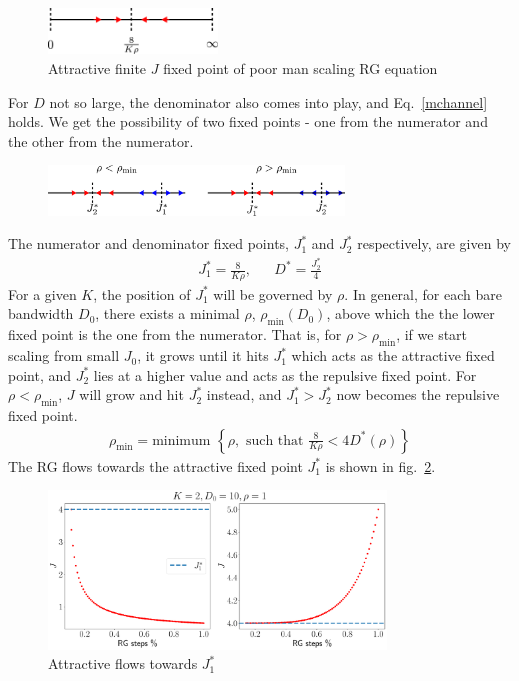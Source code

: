 \documentclass{revtex4-2}
\begin{document}
\begin{figure}[!htb]
	\centering
	\includegraphics[width=0.4\textwidth]{rg_flow_pms.pdf}
	\caption{Attractive finite \(J\) fixed point of poor man scaling RG equation}
\end{figure}
For \(D\) not so large, the denominator also comes into play, and Eq.~\ref{mchannel} holds. We get the possibility of two fixed points - one from the numerator and the other from the numerator.
\begin{figure}[!htb]
	\centering
	\includegraphics[width=0.7\textwidth]{./rg_flow.pdf}
	\caption{}
	\label{rg_flow_general}
\end{figure}

The numerator and denominator fixed points, \(J_1^*\) and \(J_2^*\) respectively, are given by
\begin{align}
	J_1^* = \frac{8}{K \rho}, && D^* = \frac{J_2^*}{4}
\end{align}
For a given \(K\), the position of \(J_1^*\) will be governed by \(\rho\). In general, for each bare bandwidth \(D_0\), there exists a minimal \(\rho\), $\rho_\text{min}(D_0)$, above which the the lower fixed point is the one from the numerator. That is, for \(\rho > \rho_\text{min}\), if we start scaling from small \(J_0\), it grows until it hits \(J_1^*\) which acts as the attractive fixed point, and \(J_2^*\) lies at a higher value and acts as the repulsive fixed point. For \(\rho < \rho_\text{min}\), \(J\) will grow and hit \(J_2^*\) instead, and \(J_1^* > J_2^*\) now becomes the repulsive fixed point.
\begin{align}
	\rho_\text{min} = \text{minimum }\left\{\rho, \text{ such that } \frac{8}{K \rho} < 4 D^*(\rho)\right\}
\end{align}
The RG flows towards the attractive fixed point \(J_1^*\) is shown  in fig.~\ref{rg_flow_K-2}.
\begin{figure}[!htpb]
	\centering
	\includegraphics[width=0.8\textwidth]{../numerics/rg_flow_K=2.pdf}
	\caption{Attractive flows towards \(J_1^*\)}
	\label{rg_flow_K-2}
\end{figure}
\end{document}
